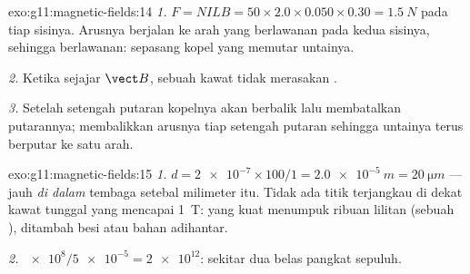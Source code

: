 \begin{solution}{exo:g11:magnetic-fields:14}
\emph{1.} $F = NILB = 50 \times 2.0 \times 0.050 \times 0.30 =
\qty{1.5}{N}$ pada tiap sisinya. Arusnya berjalan ke arah yang
berlawanan pada kedua sisinya, sehingga  berlawanan: sepasang
kopel yang memutar untainya.

\emph{2.} Ketika sejajar $\vect B$, sebuah kawat tidak merasakan .

\emph{3.} Setelah setengah putaran kopelnya akan berbalik lalu
membatalkan putarannya;  membalikkan arusnya tiap setengah
putaran sehingga untainya terus berputar ke satu arah.
\end{solution}

\begin{solution}{exo:g11:magnetic-fields:15}
\emph{1.} $d = \num{2e-7} \times 100 / 1 = \qty{2.0e-5}{m} =
\qty{20}{\micro m}$ --- jauh \emph{di dalam} tembaga setebal milimeter
itu. Tidak ada titik terjangkau di dekat kawat tunggal yang mencapai
\qty{1}{T}:  yang kuat menumpuk ribuan lilitan (sebuah
), ditambah besi atau bahan adihantar.

\emph{2.} $\num{e8} / \num{5e-5} = \num{2e12}$: sekitar dua belas
pangkat sepuluh.
\end{solution}

